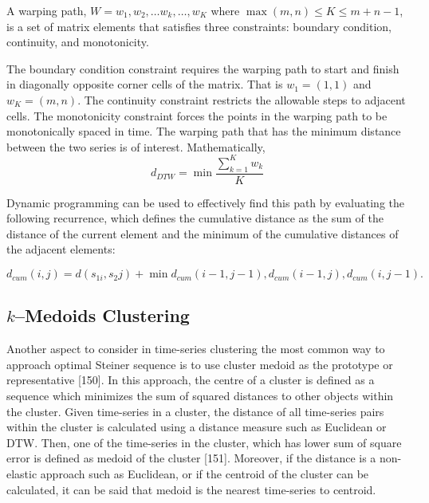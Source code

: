 A warping path, $W = w_{1} , w_{2}, \ldots w_{k}, \ldots, w_{K}$ where $\max(m, n) \leq K \leq m + n-1$, is a set of matrix elements that satisfies three constraints: boundary condition, continuity, and monotonicity. 

The boundary condition constraint requires the warping path to start and finish in diagonally opposite corner cells of the matrix. That is $w_{1} = (1, 1)$ and $w_{K} = (m, n)$. The continuity constraint restricts the allowable steps to adjacent cells. The monotonicity constraint forces the points in the warping path to be monotonically spaced in time. The warping path that has the minimum distance between the two series is of interest. Mathematically, 
\begin{equation}
d_{DTW} = \min \frac{\sum_{k=1}^{K} w_{k}}{K}
\end{equation}

Dynamic programming can be used to effectively find this path by evaluating the following recurrence, which defines the cumulative distance as the sum of the distance of the current element and the minimum of the cumulative distances of the adjacent elements:

\begin{equation}
d_{cum}(i,j) = d(s_{1i}, s_2{j}) + \min{d_{cum} (i-1, j-1), d_{cum} (i-1, j ), d_{cum} (i, j-1)}.
\end{equation}

\subsection{$k$--Medoids Clustering }

Another aspect to consider in time-series clustering the most common way to approach optimal Steiner sequence is to use cluster medoid as the prototype or representative [150]. In this approach, the centre of a cluster is defined as a sequence which minimizes the sum of squared distances to other objects within the cluster. Given time-series in a cluster, the distance of all time-series pairs within the cluster is calculated using a distance measure such as Euclidean or DTW. Then, one of the time-series in the cluster, which has lower sum of square error is defined as medoid of the cluster [151]. Moreover, if the distance is a non-elastic approach such as Euclidean, or if the centroid of the cluster can be calculated, it can be said that medoid is the nearest time-series to centroid.

